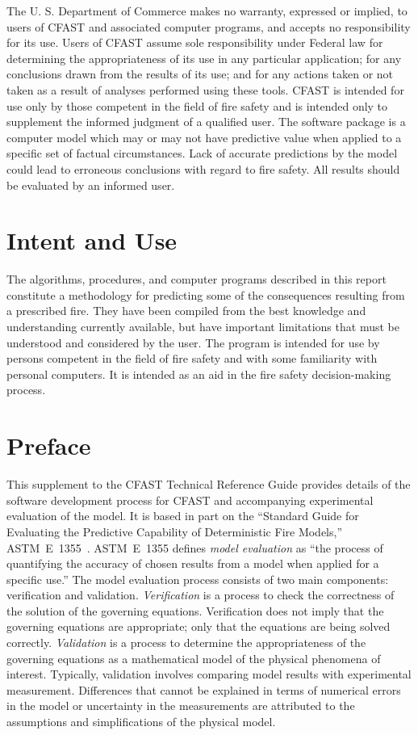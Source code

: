 \documentclass[12pt]{book}
\begin{document}
The U. S. Department of Commerce makes no warranty, expressed or implied, to users of 
CFAST and associated computer programs, and accepts no responsibility for its use.  Users of 
CFAST assume sole responsibility under Federal law for determining the appropriateness of its 
use in any particular application; for any conclusions drawn from the results of its use; and for 
any actions taken or not taken as a result of analyses performed using these tools. 
CFAST is intended for use only by those competent in the field of fire safety and is intended 
only to supplement the informed judgment of a qualified user. The software package is a 
computer model which may or may not have predictive value when applied to a specific set of 
factual circumstances. Lack of accurate predictions by the model could lead to erroneous 
conclusions with regard to fire safety. All results should be evaluated by an informed user.

\chapter{Intent and Use}

The algorithms, procedures, and computer programs described in this report constitute a 
methodology for predicting some of the consequences resulting from a prescribed fire.  They 
have been compiled from the best knowledge and understanding currently available, but have 
important limitations that must be understood and considered by the user.  The program is 
intended for use by persons competent in the field of fire safety and with some familiarity with 
personal computers. It is intended as an aid in the fire safety decision-making process.

\chapter{Preface}

This supplement to the CFAST Technical Reference Guide provides details of the software development process for CFAST and accompanying experimental evaluation of the model. It is based in part on the ``Standard Guide for Evaluating the Predictive Capability of Deterministic Fire Models,'' ASTM~E~1355~\cite{ASTM:E1355}. ASTM~E~1355 defines {\em model evaluation} as ``the process of quantifying the accuracy of chosen results from a model when applied for a specific use.'' The model evaluation process consists of two main components: verification and validation. {\em Verification} is a process to check the correctness of the solution of the governing equations. Verification does not imply that the governing equations are appropriate; only that the equations are being solved correctly. {\em Validation} is a process to determine the appropriateness of the governing equations as a mathematical model of the physical phenomena of interest. Typically, validation involves comparing model results with experimental measurement. Differences that cannot be explained in terms of numerical errors in the model or uncertainty in the measurements are attributed to the assumptions and simplifications of the physical model.
\end{document}
